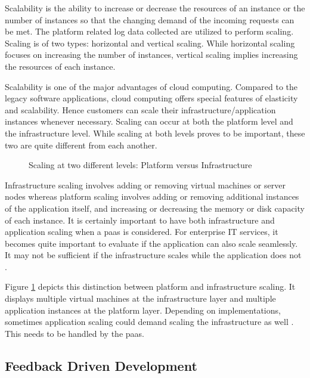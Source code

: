 \documentclass[article,type=msc,colorback,12pt,accentcolor=tud8b,table]{tudthesis}
\begin{document}
		Scalability is the ability to increase or decrease the resources of an instance or the number of instances so that the changing demand of the incoming requests can be met. The platform related log data collected are utilized to perform scaling. Scaling is of two types: horizontal and vertical scaling. While horizontal scaling focuses on increasing the number of instances, vertical scaling implies increasing the resources of each instance.
		
		Scalability is one of the major advantages of cloud computing. Compared to the legacy software applications, cloud computing offers special features of elasticity and scalability. Hence customers can scale their infrastructure/application instances whenever necessary. Scaling can occur at both the platform level and the infrastructure level. While scaling at both levels proves to be important, these two are quite different from each another. 
		
		\begin{figure}[!h]
			\begin{center}
			\end{center}
			\caption{Scaling at two different levels: Platform versus Infrastructure}
			\label{fig:scaling_infra_platform}
		\end{figure}
		
		Infrastructure scaling involves adding or removing virtual machines or server nodes whereas platform scaling involves adding or removing additional instances of the application itself, and increasing or decreasing the memory or disk capacity of each instance. It is certainly important to have both infrastructure and application scaling when a \gls{paas} is considered. For enterprise IT services, it becomes quite important to evaluate if the application can also scale seamlessly. It may not be sufficient if the infrastructure scales while the application does not \cite{app_infra_scale}. 
		
		Figure \ref{fig:scaling_infra_platform} depicts this distinction between platform and infrastructure scaling. It displays multiple virtual machines at the infrastructure layer and multiple application instances at the platform layer. Depending on implementations, sometimes application scaling could demand scaling the infrastructure as well \cite{cf_scale}. This needs to be handled by the \gls{paas}. 
		
		\subsection{Feedback Driven Development } 		
		
\end{document}
